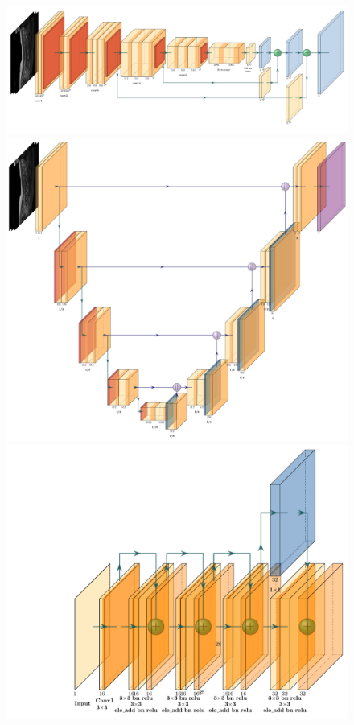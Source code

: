 \begin{figure}
    \centering
    \centering
    \begin{minipage}{.99\textwidth}
        \includegraphics[width=.99\textwidth]{images/VGG16_FCN8.pdf}
    \end{minipage} 
    \vspace{2 mm}
    \begin{minipage}{.99\textwidth}
        \includegraphics[width=.99\textwidth]{images/UNET.pdf}
    \end{minipage} 
    \vspace{2 mm}
    \begin{minipage}{.99\textwidth}
        \includegraphics[width=.7\textwidth]{images/RESNET.pdf}

\end{minipage}
\end{figure}
